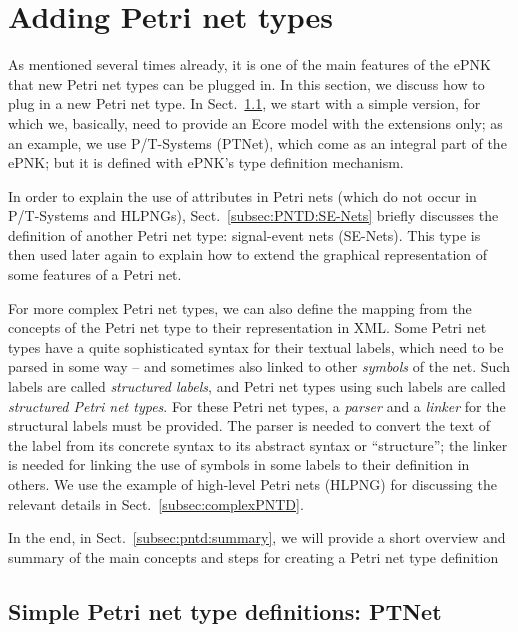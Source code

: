 
\section{Adding Petri net types}  
\label{sec:adding-types}

As mentioned several times already, it is one of the main features of the ePNK
that new Petri net types can be plugged in. In this section, we discuss how to
plug in a new Petri net type.  In Sect.~\ref{subsec:simplePNTD}, we start with a
simple version, for which we, basically, need to provide an Ecore model with
the extensions only; as an example, we use P/T-Systems (PTNet), which come as an
integral part of the ePNK; but it is defined with ePNK's type definition
mechanism.

In order to explain the use of attributes in Petri nets (which do not occur
in P/T-Systems and HLPNGs), Sect.~\ref{subsec:PNTD:SE-Nets} briefly discusses
the definition of another Petri net type: signal-event nets (SE-Nets). This type is
then used later again to explain how to extend the graphical representation of
some features of a Petri net.

For more complex Petri net types, we can also define the mapping from the
concepts of the Petri net type to their representation in XML. Some Petri
net types have a quite sophisticated syntax for their textual labels,
which need to be parsed in some way -- and sometimes also linked to
other \emph{symbols} of the net. Such labels are called \emph{structured labels},
and Petri net types using such labels are called \emph{structured Petri net
types}. For these Petri net types, a \emph{parser} and a \emph{linker} for
the structural labels must be provided. The parser is needed to convert the
text of the label from its concrete syntax to its abstract
syntax or ``structure''; the linker is needed for linking the use of symbols in
some labels to their definition in others. We use the example of high-level Petri nets (HLPNG)
for discussing the relevant details in Sect.~\ref{subsec:complexPNTD}.

In the end, in Sect.~\ref{subsec:pntd:summary}, we will provide a short overview
and summary of the main concepts and steps for creating a Petri net type definition 
  
\subsection{Simple Petri net type definitions: PTNet}
\label{subsec:simplePNTD}

